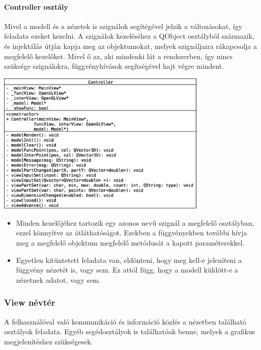 \documentclass[12pt]{report}
\begin{document}
\paragraph{Controller osztály}
Mivel a modell és a nézetek is szignálok segítégével jelzik a változásokat, így feladata ezeket kezelni. A szignálok kezeléséhez a QObject osztályból származik, és injektálás útján kapja meg az objektumokat, melyek szignáljaira rákapcsolja a megfelelő kezelőket. Mivel ő az, aki mindenki lát a rendszerben, így nincs szüksége szignálokra, függvényhívások segítségével hajt végre mindent.
\begin{center}
\includegraphics[width=10cm]{pics/uml/Controller}
\end{center}
\begin{itemize}
\item Minden kezelőjéhez tartozik egy azonos nevű szignál a megfelelő osztályban, ezzel könnyítve az átláthatóságot. Ezekben a függvényekben további hívja meg a megfelelő objektum megfelelő metódusát a kapott paraméterekkel.
\item Egyetlen kitüntetett feladata van, eldönteni, hogy meg kell-e jeleníteni a függvény nézetét is, vagy sem. Ez attól függ, hogy a modell küldött-e a nézetnek adatot, vagy sem.
\end{itemize}

\subsubsection{View névtér}
A felhasználóval való kommunikáció és információ közlés a nézetben található osztályok feladata. Egyéb segédosztályok is találhatóak benne, melyek a grafikus megjelenítéshez szükségesek.
\end{document}
